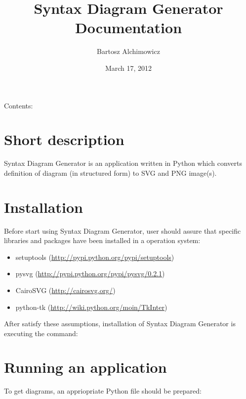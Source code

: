 \documentclass[letterpaper,10pt,english]{sphinxmanual}
\title{Syntax Diagram Generator Documentation}
\date{March 17, 2012}
\author{Bartosz Alchimowicz}
\begin{document}
\maketitle
\tableofcontents
{}\label{index::doc}


Contents:


\chapter{Short description}
\label{intro:welcome-to-syntax-diagram-generator-s-documentation}\label{intro:short-description}\label{intro::doc}
Syntax Diagram Generator is an application written in Python which converts definition of diagram (in structured form) to SVG and PNG image(s).


\chapter{Installation}
\label{installation:installation}\label{installation::doc}
Before start using Syntax Diagram Generator, user should assure that specific libraries and packages have been installed in a operation system:
\begin{itemize}
\item {} 
setuptools (\href{http://pypi.python.org/pypi/setuptools}{http://pypi.python.org/pypi/setuptools})

\item {} 
pysvg (\href{http://pypi.python.org/pypi/pysvg/0.2.1}{http://pypi.python.org/pypi/pysvg/0.2.1})

\item {} 
CairoSVG (\href{http://cairosvg.org/}{http://cairosvg.org/})

\item {} 
python-tk (\href{http://wiki.python.org/moin/TkInter}{http://wiki.python.org/moin/TkInter})

\end{itemize}

After satisfy these assumptions, installation of Syntax Diagram Generator is executing the command:



\chapter{Running an application}
\label{running:running-an-application}\label{running::doc}
To get diagrams, an appriopriate Python file should be prepared:
\end{document}
